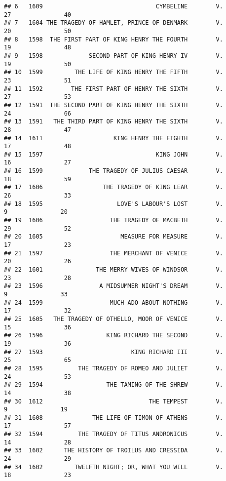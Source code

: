 \documentclass{article}\usepackage[]{graphicx}\usepackage[]{color}
\makeatletter
\newenvironment{kframe}{%
 \def\at@end@of@kframe{}%
 \ifinner\ifhmode%
  \def\at@end@of@kframe{\end{minipage}}%
  \begin{minipage}{\columnwidth}%
 \fi\fi%
 \def\FrameCommand##1{\hskip\@totalleftmargin \hskip-\fboxsep
 \colorbox{shadecolor}{##1}\hskip-\fboxsep
     \hskip-\linewidth \hskip-\@totalleftmargin \hskip\columnwidth}%
 \MakeFramed {\advance\hsize-\width
   \@totalleftmargin\z@ \linewidth\hsize
   \@setminipage}}%
 {\par\unskip\endMakeFramed%
 \at@end@of@kframe}
\newenvironment{knitrout}{}{} %
\makeatother
\begin{document}
\begin{knitrout}
\begin{kframe}
\begin{verbatim}
## 6   1609                                CYMBELINE        V.          27               40
## 7   1604 THE TRAGEDY OF HAMLET, PRINCE OF DENMARK        V.          20               50
## 8   1598  THE FIRST PART OF KING HENRY THE FOURTH        V.          19               48
## 9   1598             SECOND PART OF KING HENRY IV        V.          19               50
## 10  1599         THE LIFE OF KING HENRY THE FIFTH        V.          23               51
## 11  1592        THE FIRST PART OF HENRY THE SIXTH        V.          27               53
## 12  1591  THE SECOND PART OF KING HENRY THE SIXTH        V.          24               66
## 13  1591   THE THIRD PART OF KING HENRY THE SIXTH        V.          28               47
## 14  1611                    KING HENRY THE EIGHTH        V.          17               48
## 15  1597                                KING JOHN        V.          16               27
## 16  1599             THE TRAGEDY OF JULIUS CAESAR        V.          18               59
## 17  1606                 THE TRAGEDY OF KING LEAR        V.          26               33
## 18  1595                     LOVE'S LABOUR'S LOST        V.           9               20
## 19  1606                   THE TRAGEDY OF MACBETH        V.          29               52
## 20  1605                      MEASURE FOR MEASURE        V.          17               23
## 21  1597                   THE MERCHANT OF VENICE        V.          20               26
## 22  1601               THE MERRY WIVES OF WINDSOR        V.          23               28
## 23  1596                A MIDSUMMER NIGHT'S DREAM        V.           9               33
## 24  1599                   MUCH ADO ABOUT NOTHING        V.          17               32
## 25  1605   THE TRAGEDY OF OTHELLO, MOOR OF VENICE        V.          15               36
## 26  1596                  KING RICHARD THE SECOND        V.          19               36
## 27  1593                         KING RICHARD III        V.          25               65
## 28  1595          THE TRAGEDY OF ROMEO AND JULIET        V.          24               53
## 29  1594                  THE TAMING OF THE SHREW        V.          14               38
## 30  1612                              THE TEMPEST        V.           9               19
## 31  1608              THE LIFE OF TIMON OF ATHENS        V.          17               57
## 32  1594          THE TRAGEDY OF TITUS ANDRONICUS        V.          14               28
## 33  1602      THE HISTORY OF TROILUS AND CRESSIDA        V.          24               29
## 34  1602         TWELFTH NIGHT; OR, WHAT YOU WILL        V.          18               23

\end{verbatim}
\end{kframe}
\end{knitrout}
\end{document}
